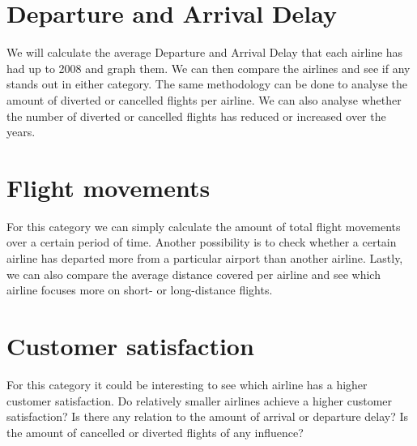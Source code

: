\documentclass[11pt,oneside]{book}
\begin{document}
\section*{Departure and Arrival Delay}
We will calculate the average Departure and Arrival Delay that each airline has had up to 2008 and graph them. We can then compare the airlines and see if any stands out in either category. The same methodology can be done to analyse the amount of diverted or cancelled flights per airline. We can also analyse whether the number of diverted or cancelled flights has reduced or increased over the years. 
\section*{Flight movements}
For this category we can simply calculate the amount of total flight movements over a certain period of time. Another possibility is to check whether a certain airline has departed more from a particular airport than another airline. Lastly, we can also compare the average distance covered per airline and see which airline focuses more on short- or long-distance flights. 
\section*{Customer satisfaction}
For this category it could be interesting to see which airline has a higher customer satisfaction. Do relatively smaller airlines achieve a higher customer satisfaction? Is there any relation to the amount of arrival or departure delay? Is the amount of cancelled or diverted flights of any influence?  


\end{document}

